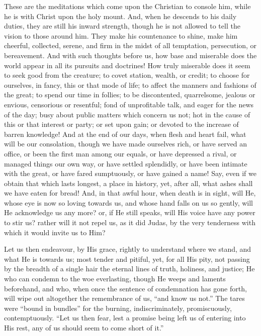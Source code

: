 These are the meditations which come upon the Christian to console
him, while he is with Christ upon the holy mount. And, when he
descends to his daily duties, they are still his inward strength,
though he is not allowed to tell the vision to those around him. They
make his countenance to shine, make him cheerful, collected, serene,
and firm in the midst of all temptation, persecution, or bereavement.
And with such thoughts before us, how base and miserable does the
world appear in all its pursuits and doctrines! How truly miserable
does it seem to seek good from the creature; to covet station, wealth,
or credit; to choose for ourselves, in fancy, this or that mode of
life; to affect the manners and fashions of the great; to spend our
time in follies; to be discontented, quarrelsome, jealous or envious,
censorious or resentful; fond of unprofitable talk, and eager for the
news of the day; busy about public matters which concern us not; hot
in the cause of this or that interest or party; or set upon gain; or
devoted to the increase of barren knowledge! And at the end of our
days, when flesh and heart fail, what will be our consolation, though
we have made ourselves rich, or have served an office, or been the
first man among our equals, or have depressed a rival, or managed
things our own way, or have settled splendidly, or have been intimate
with the great, or have fared sumptuously, or have gained a name! Say,
even if we obtain that which lasts longest, a place in history, yet,
after all, what ashes shall we have eaten for bread! And, in that
awful hour, when death is in sight, will He, whose eye is now so
loving towards us, and whose hand falls on us so gently, will He
acknowledge us any more? or, if He still speaks, will His voice have
any power to stir us? rather will it not repel us, as it did Judas, by
the very tenderness with which it would invite us to Him?

Let us then endeavour, by His grace, rightly to understand where we
stand, and what He is towards us; most tender and pitiful, yet, for
all His pity, not passing by the breadth of a single hair the eternal
lines of truth, holiness, and justice; He who can condemn to the woe
everlasting, though He weeps and laments beforehand, and who, when
once the sentence of condemnation has gone forth, will wipe out
altogether the remembrance of us, ``and know us not.'' The
tares were ``bound in bundles'' for the burning,
indiscriminately, promiscuously, contemptuously. ``Let us then
fear, lest a promise being left us of entering into His rest, any of
us should seem to come short of it.''


